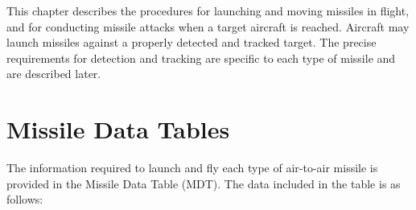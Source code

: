 
\label{rule:air-to-air-missiles}

This chapter describes the procedures for launching and moving missiles in flight, and for conducting missile attacks when a target aircraft is reached. Aircraft may launch missiles against a properly detected and tracked target. The precise requirements for detection and tracking are specific to each type of missile and are described later.

\section{Missile Data Tables}
\label{rule:missile-data}

The information required to launch and fly each type of air-to-air missile is provided in the Missile Data Table (MDT). The data included in the table is as follows:


